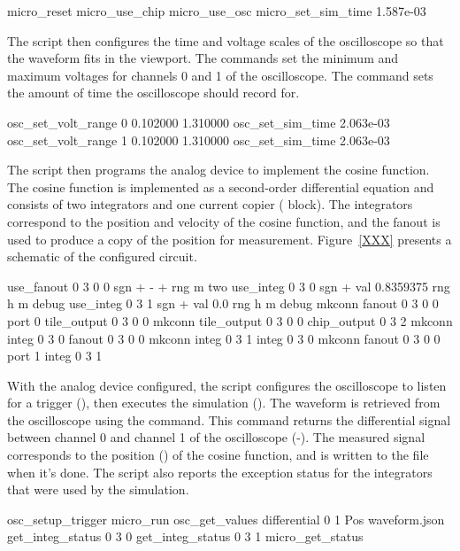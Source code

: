 \begin{snippet}
micro_reset
micro_use_chip
micro_use_osc
micro_set_sim_time 1.587e-03
\end{snippet}

The \grendel script then configures the time and voltage scales of the
oscilloscope so that the waveform fits in the viewport. The 
commands set the minimum and maximum voltages for channels 0 and 1 of the
oscilloscope. The  command sets the amount of time the
oscilloscope should record for.

\begin{snippet}
osc_set_volt_range 0 0.102000 1.310000
osc_set_sim_time 2.063e-03
osc_set_volt_range 1 0.102000 1.310000
osc_set_sim_time 2.063e-03
\end{snippet}

The \grendel script then programs the analog device to implement the cosine
function. The cosine function is implemented as a second-order differential
equation and consists of two integrators and one current copier (
block). The integrators correspond to the position and velocity of the cosine
function, and the fanout is used to produce a copy of the position for
measurement. Figure~\ref{XXX} presents a schematic of the configured circuit.

\begin{snippet}
use_fanout 0 3 0 0  sgn + - + rng m two
use_integ 0 3 0 sgn + val 0.8359375 rng h m debug
use_integ 0 3 1 sgn + val 0.0 rng h m debug
mkconn fanout 0 3 0 0 port 0 tile_output 0 3 0 0
mkconn tile_output 0 3 0 0 chip_output 0 3 2
mkconn integ 0 3 0 fanout 0 3 0 0
mkconn integ 0 3 1 integ 0 3 0
mkconn fanout 0 3 0 0 port 1 integ 0 3 1
\end{snippet}

With the analog device configured, the \grendel script configures the
oscilloscope to listen for a trigger (), then executes
the simulation (). The waveform is retrieved from the oscilloscope using the
 command. This command returns the differential signal
between channel 0 and channel 1 of the oscilloscope (-). The
measured signal corresponds to the position () of the cosine function,
and is written to the  file when it's done. The \grendel
script also reports the exception status for the integrators that were used by
the simulation. 

\begin{snippet}
osc_setup_trigger
micro_run
osc_get_values differential 0 1 Pos waveform.json
get_integ_status 0 3 0
get_integ_status 0 3 1
micro_get_status
\end{snippet}

